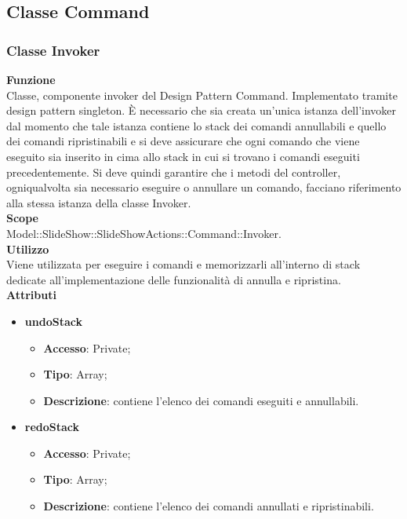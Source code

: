 \subsection{Classe Command}{
	\subsubsection{Classe Invoker}{
	\textbf{Funzione}\\
		\indent Classe, componente invoker del Design Pattern Command. Implementato tramite design pattern singleton. È necessario che sia creata un'unica istanza dell'invoker dal momento che tale istanza contiene lo stack dei comandi annullabili e quello dei comandi ripristinabili e si deve assicurare che ogni comando che viene eseguito sia inserito in cima allo stack in cui si trovano i comandi eseguiti precedentemente. Si deve quindi garantire che i metodi del controller, ogniqualvolta sia necessario eseguire o annullare un comando, facciano riferimento alla stessa istanza della classe Invoker.\\
	\textbf{Scope}\\
		\indent Model::SlideShow::SlideShowActions::Command::Invoker.\\
	\textbf{Utilizzo}\\
		\indent Viene utilizzata per eseguire i comandi e memorizzarli all’interno di stack dedicate all’implementazione delle funzionalità di annulla e ripristina.\\
	\textbf{Attributi}
	\begin{itemize}
		\item \textbf{undoStack}
		\begin{itemize}
			\item \textbf{Accesso}: Private;
			\item \textbf{Tipo}: Array;
			\item \textbf{Descrizione}: contiene l’elenco dei comandi eseguiti e annullabili.
		\end{itemize}
		\item \textbf{redoStack}
		\begin{itemize}
			\item \textbf{Accesso}: Private;
			\item \textbf{Tipo}: Array;
			\item \textbf{Descrizione}: contiene l’elenco dei comandi annullati e ripristinabili.
		\end{itemize}
	\end{itemize}
	\begin{itemize}

\end{itemize}}}
